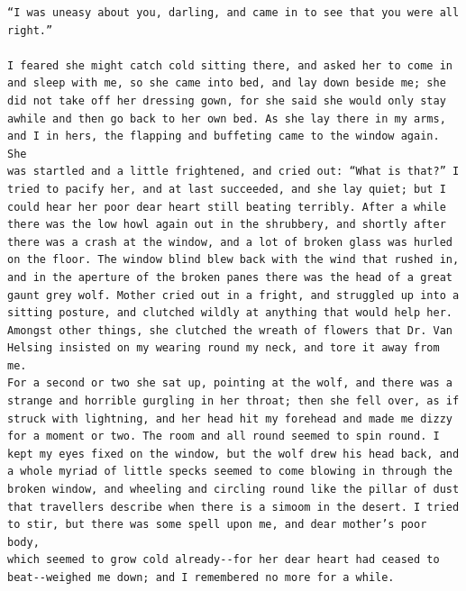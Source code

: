 \documentclass{article}
\begin{document}
\begin{verbatim}
“I was uneasy about you, darling, and came in to see that you were all
right.”

I feared she might catch cold sitting there, and asked her to come in
and sleep with me, so she came into bed, and lay down beside me; she
did not take off her dressing gown, for she said she would only stay
awhile and then go back to her own bed. As she lay there in my arms,
and I in hers, the flapping and buffeting came to the window again. She
was startled and a little frightened, and cried out: “What is that?” I
tried to pacify her, and at last succeeded, and she lay quiet; but I
could hear her poor dear heart still beating terribly. After a while
there was the low howl again out in the shrubbery, and shortly after
there was a crash at the window, and a lot of broken glass was hurled
on the floor. The window blind blew back with the wind that rushed in,
and in the aperture of the broken panes there was the head of a great
gaunt grey wolf. Mother cried out in a fright, and struggled up into a
sitting posture, and clutched wildly at anything that would help her.
Amongst other things, she clutched the wreath of flowers that Dr. Van
Helsing insisted on my wearing round my neck, and tore it away from me.
For a second or two she sat up, pointing at the wolf, and there was a
strange and horrible gurgling in her throat; then she fell over, as if
struck with lightning, and her head hit my forehead and made me dizzy
for a moment or two. The room and all round seemed to spin round. I
kept my eyes fixed on the window, but the wolf drew his head back, and
a whole myriad of little specks seemed to come blowing in through the
broken window, and wheeling and circling round like the pillar of dust
that travellers describe when there is a simoom in the desert. I tried
to stir, but there was some spell upon me, and dear mother’s poor body,
which seemed to grow cold already--for her dear heart had ceased to
beat--weighed me down; and I remembered no more for a while.


\end{verbatim}
\end{document}
